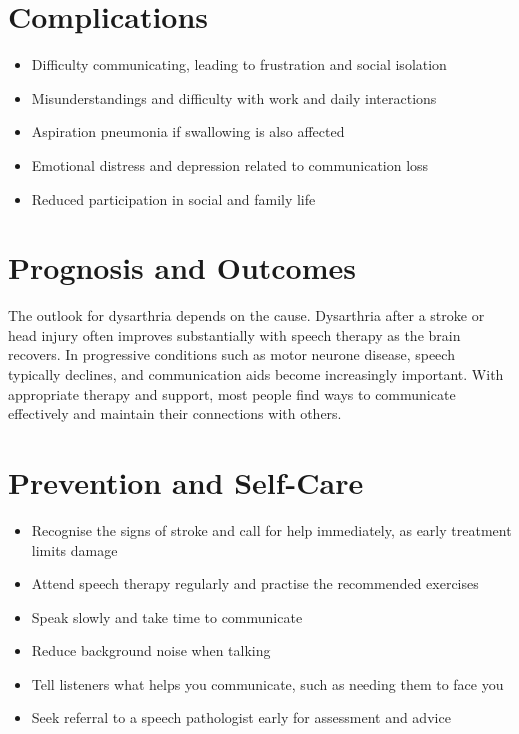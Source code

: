 \section*{Complications}
\begin{itemize}
    \item Difficulty communicating, leading to frustration and social isolation
    \item Misunderstandings and difficulty with work and daily interactions
    \item Aspiration pneumonia if swallowing is also affected
    \item Emotional distress and depression related to communication loss
    \item Reduced participation in social and family life
\end{itemize}

\section*{Prognosis and Outcomes}
The outlook for dysarthria depends on the cause. Dysarthria after a stroke or head injury often improves substantially with speech therapy as the brain recovers. In progressive conditions such as motor neurone disease, speech typically declines, and communication aids become increasingly important. With appropriate therapy and support, most people find ways to communicate effectively and maintain their connections with others.

\section*{Prevention and Self-Care}
\begin{itemize}
    \item Recognise the signs of stroke and call for help immediately, as early treatment limits damage
    \item Attend speech therapy regularly and practise the recommended exercises
    \item Speak slowly and take time to communicate
    \item Reduce background noise when talking
    \item Tell listeners what helps you communicate, such as needing them to face you
    \item Seek referral to a speech pathologist early for assessment and advice
\end{itemize}

